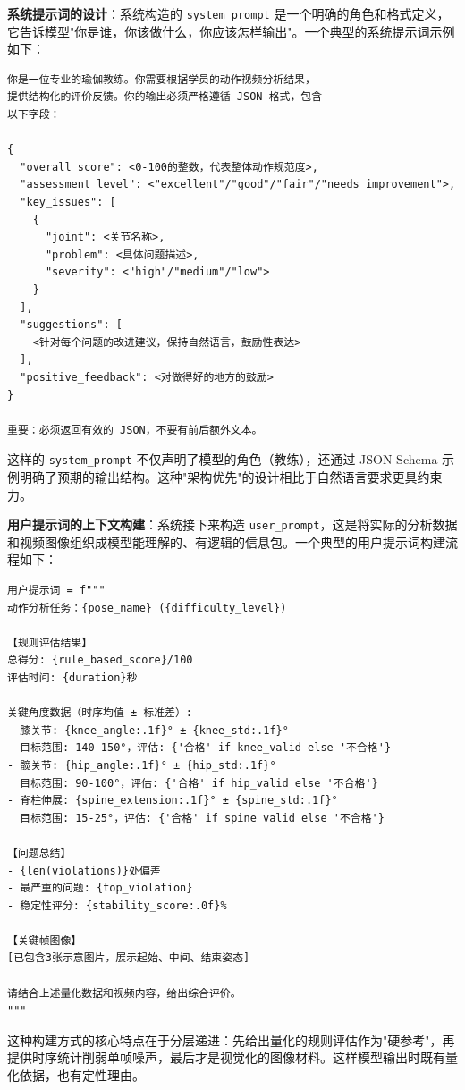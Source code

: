 \textbf{系统提示词的设计}：系统构造的 \texttt{system\_prompt} 是一个明确的角色和格式定义，它告诉模型"你是谁，你该做什么，你应该怎样输出"。一个典型的系统提示词示例如下：

\begin{verbatim}
你是一位专业的瑜伽教练。你需要根据学员的动作视频分析结果，
提供结构化的评价反馈。你的输出必须严格遵循 JSON 格式，包含
以下字段：

{
  "overall_score": <0-100的整数，代表整体动作规范度>,
  "assessment_level": <"excellent"/"good"/"fair"/"needs_improvement">,
  "key_issues": [
    {
      "joint": <关节名称>,
      "problem": <具体问题描述>,
      "severity": <"high"/"medium"/"low">
    }
  ],
  "suggestions": [
    <针对每个问题的改进建议，保持自然语言，鼓励性表达>
  ],
  "positive_feedback": <对做得好的地方的鼓励>
}

重要：必须返回有效的 JSON，不要有前后额外文本。
\end{verbatim}

这样的 \texttt{system\_prompt} 不仅声明了模型的角色（教练），还通过 JSON Schema 示例明确了预期的输出结构。这种"架构优先"的设计相比于自然语言要求更具约束力。

\textbf{用户提示词的上下文构建}：系统接下来构造 \texttt{user\_prompt}，这是将实际的分析数据和视频图像组织成模型能理解的、有逻辑的信息包。一个典型的用户提示词构建流程如下：

\begin{verbatim}
用户提示词 = f"""
动作分析任务：{pose_name} ({difficulty_level})

【规则评估结果】
总得分: {rule_based_score}/100
评估时间: {duration}秒

关键角度数据（时序均值 ± 标准差）:
- 膝关节: {knee_angle:.1f}° ± {knee_std:.1f}°
  目标范围: 140-150°，评估: {'合格' if knee_valid else '不合格'}
- 髋关节: {hip_angle:.1f}° ± {hip_std:.1f}°
  目标范围: 90-100°，评估: {'合格' if hip_valid else '不合格'}
- 脊柱伸展: {spine_extension:.1f}° ± {spine_std:.1f}°
  目标范围: 15-25°，评估: {'合格' if spine_valid else '不合格'}

【问题总结】
- {len(violations)}处偏差
- 最严重的问题: {top_violation}
- 稳定性评分: {stability_score:.0f}%

【关键帧图像】
[已包含3张示意图片，展示起始、中间、结束姿态]

请结合上述量化数据和视频内容，给出综合评价。
"""
\end{verbatim}

这种构建方式的核心特点在于分层递进：先给出量化的规则评估作为"硬参考"，再提供时序统计削弱单帧噪声，最后才是视觉化的图像材料。这样模型输出时既有量化依据，也有定性理由。

